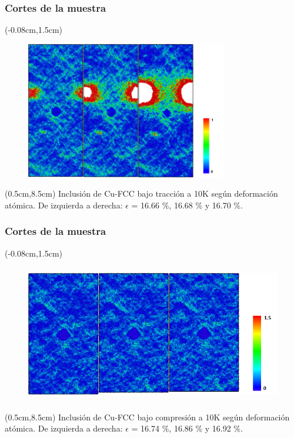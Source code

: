 \begin{frame}
  \frametitle{Cortes de la muestra}
  \begin{textblock*}{12.6cm}(-0.08cm,1.5cm) 
    \begin{figure}[htp]
     \centering
     \includegraphics[height=6cm]{cuSphereTension_10K_Snapshots.png}
    \end{figure}
  \end{textblock*}
  \begin{textblock*}{12cm}(0.5cm,8.5cm) 
    \centering
      \small{Inclusi\'on de Cu-FCC bajo tracci\'on a 10K según deformaci\'on atómica. De izquierda a derecha: $\epsilon$ = 16.66 \%, 16.68 \% y 16.70 \%.}
    \end{textblock*}
    
\end{frame}

\begin{frame}
  \frametitle{Cortes de la muestra}
  \begin{textblock*}{12.6cm}(-0.08cm,1.5cm) 
    \begin{figure}[htp]
     \centering
     \includegraphics[height=6cm]{cuSphereCompression_10K_Snapshots.png}
    \end{figure}
  \end{textblock*}
  \begin{textblock*}{12cm}(0.5cm,8.5cm) 
    \centering
      \small{Inclusi\'on de Cu-FCC bajo compresi\'on a 10K según deformaci\'on atómica. De izquierda a derecha: $\epsilon$ = 16.74 \%, 16.86 \% y 16.92 \%.}
    \end{textblock*}
\end{frame}

